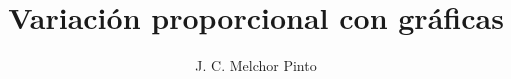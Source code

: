 \documentclass[12pt]{guia}
\title{Variación proporcional con gráficas}
\author{J. C. Melchor Pinto}
\begin{document}
\pagestyle{headandfoot}
\addpoints
\INFO
\begin{multicols}{2}
    
    
\end{multicols}
\begin{questions}
    
    
    
\end{questions}
\end{document}

